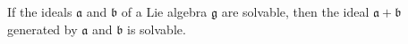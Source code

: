 If the ideals $\mathfrak{a}$ and $\mathfrak{b}$ of a Lie algebra $\mathfrak{g}$ are solvable, then the ideal $\mathfrak{a} + \mathfrak{b}$ generated by $\mathfrak{a}$ and $\mathfrak{b}$ is solvable.
